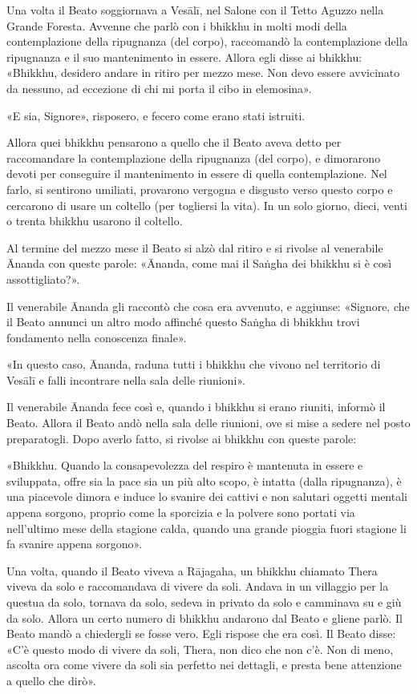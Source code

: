 

Una volta il Beato soggiornava a Vesālī, nel Salone con il Tetto Aguzzo
nella Grande Foresta. Avvenne che parlò con i bhikkhu in molti modi
della contemplazione della ripugnanza (del corpo), raccomandò la
contemplazione della ripugnanza e il suo mantenimento in essere. Allora
egli disse ai bhikkhu: «Bhikkhu, desidero andare in ritiro per mezzo
mese. Non devo essere avvicinato da nessuno, ad eccezione di chi mi
porta il cibo in elemosina».


«E sia, Signore», risposero, e fecero come erano stati istruiti.


Allora quei bhikkhu pensarono a quello che il Beato aveva detto per
raccomandare la contemplazione della ripugnanza (del corpo), e
dimorarono devoti per conseguire il mantenimento in essere di quella
contemplazione. Nel farlo, si sentirono umiliati, provarono vergogna e
disgusto verso questo corpo e cercarono di usare un coltello (per
togliersi la vita). In un solo giorno, dieci, venti o trenta bhikkhu
usarono il coltello.


Al termine del mezzo mese il Beato si alzò dal ritiro e si rivolse al
venerabile Ānanda con queste parole: «Ānanda, come mai il Saṅgha dei
bhikkhu si è così assottigliato?».


Il venerabile Ānanda gli raccontò che cosa era avvenuto, e aggiunse:
«Signore, che il Beato annunci un altro modo affinché questo Saṅgha di
bhikkhu trovi fondamento nella conoscenza finale».


«In questo caso, Ānanda, raduna tutti i bhikkhu che vivono nel
territorio di Vesālī e falli incontrare nella sala delle riunioni».


Il venerabile Ānanda fece così e, quando i bhikkhu si erano riuniti,
informò il Beato. Allora il Beato andò nella sala delle riunioni, ove si
mise a sedere nel posto preparatogli. Dopo averlo fatto, si rivolse ai
bhikkhu con queste parole:


«Bhikkhu. Quando la consapevolezza del respiro è mantenuta in essere e
sviluppata, offre sia la pace sia un più alto scopo, è intatta (dalla
ripugnanza), è una piacevole dimora e induce lo svanire dei cattivi e
non salutari oggetti mentali appena sorgono, proprio come la sporcizia e
la polvere sono portati via nell’ultimo mese della stagione calda,
quando una grande pioggia fuori stagione li fa svanire appena sorgono».




Una volta, quando il Beato viveva a Rājagaha, un bhikkhu chiamato Thera
viveva da solo e raccomandava di vivere da soli. Andava in un villaggio
per la questua da solo, tornava da solo, sedeva in privato da solo e
camminava su e giù da solo. Allora un certo numero di bhikkhu andarono
dal Beato e gliene parlò. Il Beato mandò a chiedergli se fosse vero.
Egli rispose che era così. Il Beato disse: «C’è questo modo di vivere da
soli, Thera, non dico che non c’è. Non di meno, ascolta ora come vivere
da soli sia perfetto nei dettagli, e presta bene attenzione a quello che
dirò».


